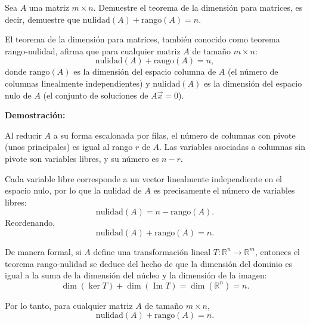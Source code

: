 \begin{prob}
Sea $A$ una matriz $m\times n$. Demuestre el teorema de la dimensión para matrices, es decir, demuestre que $\mathrm{nulidad}(A) + \mathrm{rango}(A) = n$.
\begin{myproof}
El teorema de la dimensión para matrices, también conocido como teorema rango-nulidad, afirma que para cualquier matriz $A$ de tamaño $m \times n$:
\[
\mathrm{nulidad}(A) + \mathrm{rango}(A) = n,
\]
donde $\mathrm{rango}(A)$ es la dimensión del espacio columna de $A$ (el número de columnas linealmente independientes) y $\mathrm{nulidad}(A)$ es la dimensión del espacio nulo de $A$ (el conjunto de soluciones de $A\vec{x} = 0$).

\textbf{Demostración:}

Al reducir $A$ a su forma escalonada por filas, el número de columnas con pivote (unos principales) es igual al rango $r$ de $A$. Las variables asociadas a columnas sin pivote son variables libres, y su número es $n - r$.

Cada variable libre corresponde a un vector linealmente independiente en el espacio nulo, por lo que la nulidad de $A$ es precisamente el número de variables libres:
\[
\mathrm{nulidad}(A) = n - \mathrm{rango}(A).
\]
Reordenando,
\[
\mathrm{nulidad}(A) + \mathrm{rango}(A) = n.
\]

De manera formal, si $A$ define una transformación lineal $T: \mathbb{R}^n \to \mathbb{R}^m$, entonces el teorema rango-nulidad se deduce del hecho de que la dimensión del dominio es igual a la suma de la dimensión del núcleo y la dimensión de la imagen:
\[
\dim(\ker T) + \dim(\operatorname{Im} T) = \dim(\mathbb{R}^n) = n.
\]

Por lo tanto, para cualquier matriz $A$ de tamaño $m \times n$,
\[
\mathrm{nulidad}(A) + \mathrm{rango}(A) = n.
\]
\end{myproof}
\end{prob}




